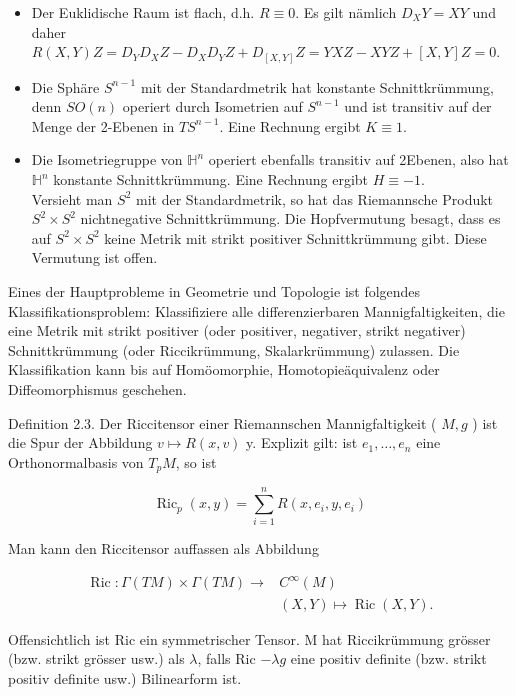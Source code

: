 \documentclass[10pt, letterpaper]{article}
\begin{document}
\begin{itemize}
  \item Der Euklidische Raum ist flach, d.h. $R \equiv 0$. Es gilt nämlich $D_{X} Y=X Y$ und daher\\
$R(X, Y) Z=D_{Y} D_{X} Z-D_{X} D_{Y} Z+D_{[X, Y]} Z=Y X Z-X Y Z+[X, Y] Z=0$.
  \item Die Sphäre $S^{n-1}$ mit der Standardmetrik hat konstante Schnittkrümmung, denn $S O(n)$ operiert durch Isometrien auf $S^{n-1}$ und ist transitiv auf der Menge der 2-Ebenen in $T S^{n-1}$. Eine Rechnung ergibt $K \equiv 1$.
  \item Die Isometriegruppe von $\mathbb{H}^{n}$ operiert ebenfalls transitiv auf 2Ebenen, also hat $\mathbb{H}^{n}$ konstante Schnittkrümmung. Eine Rechnung ergibt $H \equiv-1$.\\
Versieht man $S^{2}$ mit der Standardmetrik, so hat das Riemannsche Produkt $S^{2} \times S^{2}$ nichtnegative Schnittkrümmung. Die Hopfvermutung besagt, dass es auf $S^{2} \times S^{2}$ keine Metrik mit strikt positiver Schnittkrümmung gibt. Diese Vermutung ist offen.
\end{itemize}

Eines der Hauptprobleme in Geometrie und Topologie ist folgendes Klassifikationsproblem: Klassifiziere alle differenzierbaren Mannigfaltigkeiten, die eine Metrik mit strikt positiver (oder positiver, negativer, strikt negativer) Schnittkrümmung (oder Riccikrümmung, Skalarkrümmung) zulassen. Die Klassifikation kann bis auf Homöomorphie, Homotopieäquivalenz oder Diffeomorphismus geschehen.

Definition 2.3. Der Riccitensor einer Riemannschen Mannigfaltigkeit ( $M, g$ ) ist die Spur der Abbildung $v \mapsto R(x, v)$ y. Explizit gilt: ist $e_{1}, \ldots, e_{n}$ eine Orthonormalbasis von $T_{p} M$, so ist

$$
\operatorname{Ric}_{p}(x, y)=\sum_{i=1}^{n} R\left(x, e_{i}, y, e_{i}\right)
$$

Man kann den Riccitensor auffassen als Abbildung

$$
\begin{aligned}
\operatorname{Ric}: \Gamma(T M) \times \Gamma(T M) \rightarrow & C^{\infty}(M) \\
& (X, Y) \mapsto \operatorname{Ric}(X, Y) .
\end{aligned}
$$

Offensichtlich ist Ric ein symmetrischer Tensor. M hat Riccikrümmung grösser (bzw. strikt grösser usw.) als $\lambda$, falls Ric $-\lambda g$ eine positiv definite (bzw. strikt positiv definite usw.) Bilinearform ist.
\end{document}
